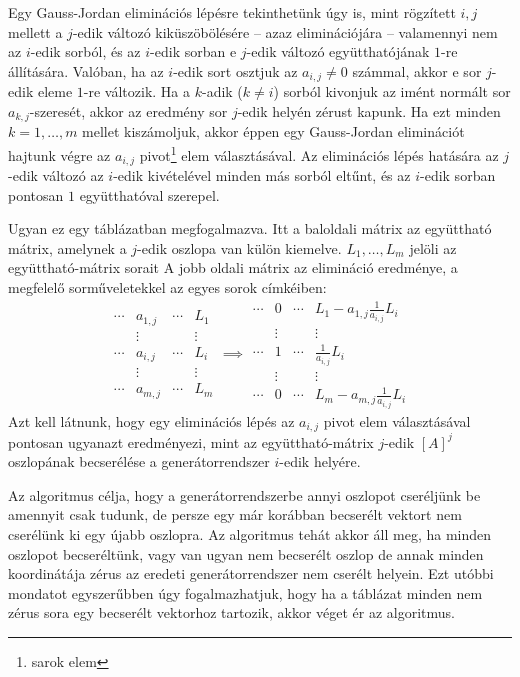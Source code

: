 \documentclass[9pt, showtrims]{memoir}
\theoremstyle{plain}
\theoremstyle{remark}
\theoremstyle{definition}
\begin{document}
Egy Gauss-Jordan eliminációs lépésre tekinthetünk úgy is,
mint rögzített $i,j$ mellett a $j$-edik változó kiküszöbölésére
-- azaz eliminációjára -- 
valamennyi nem az $i$-edik sorból,
és az $i$-edik sorban e $j$-edik változó együtthatójának $1$-re állítására.
Valóban,
ha az $i$-edik sort osztjuk az $a_{i,j}\neq 0$ számmal, akkor e sor $j$-edik
eleme $1$-re változik.
Ha a $k$-adik ($k\neq i$) sorból kivonjuk az imént normált sor
$a_{k,j}$-szeresét, akkor az eredmény sor $j$-edik helyén zérust kapunk.
Ha ezt minden $k=1,\dots,m$ mellet kiszámoljuk, akkor éppen egy Gauss-Jordan
eliminációt hajtunk végre az $a_{i,j}$ pivot\footnote{sarok elem} elem választásával.
Az eliminációs lépés hatására az $j$-edik változó az $i$-edik kivételével
minden más sorból eltűnt, és az $i$-edik sorban pontosan $1$ együtthatóval szerepel.

Ugyan ez egy táblázatban megfogalmazva. 
Itt a baloldali mátrix az együttható mátrix, amelynek
a $j$-edik oszlopa van külön kiemelve.
$L_1,\dots,L_m$ jelöli az együttható-mátrix sorait
A jobb oldali mátrix az elimináció eredménye, a megfelelő sorműveletekkel az egyes sorok
címkéiben:
\[
    \begin{array}{ccc|c}
        \cdots&a_{1,j}&\cdots&L_1\\
        &\vdots&       &\vdots\\
        \cdots&\boxed{a_{i,j}}&\cdots&L_i\\
        &\vdots&       &\vdots\\
        \cdots&a_{m,j}&\cdots&L_m
    \end{array}
    \implies
    \begin{array}{ccc|c}
        \cdots&0&\cdots&L_1-a_{1,j}\frac{1}{a_{i,j}}L_i\\
        &\vdots&       &\vdots\\
        \cdots&1&\cdots&\frac{1}{a_{i,j}}L_i\\
        &\vdots&       &\vdots\\
        \cdots&0&\cdots&L_m-a_{m,j}\frac{1}{a_{i,j}}L_i
    \end{array}
\]
Azt kell látnunk, hogy egy eliminációs lépés az $a_{i,j}$ pivot elem választásával pontosan ugyanazt eredményezi, 
mint az együttható-mátrix $j$-edik $\left[ A \right]^j$ oszlopának becserélése a generátorrendszer $i$-edik helyére. 

Az algoritmus célja, hogy
a generátorrendszerbe annyi oszlopot cseréljünk be amennyit csak tudunk, 
de persze egy már korábban becserélt vektort nem cserélünk ki egy újabb oszlopra.
Az algoritmus tehát akkor áll meg,
ha minden oszlopot becseréltünk, 
vagy van ugyan nem becserélt oszlop de annak minden koordinátája zérus az eredeti generátorrendszer nem cserélt helyein.
Ezt utóbbi mondatot egyszerűbben úgy fogalmazhatjuk, 
hogy ha a táblázat minden nem zérus sora egy becserélt vektorhoz tartozik,
akkor véget ér az algoritmus.
\end{document}
